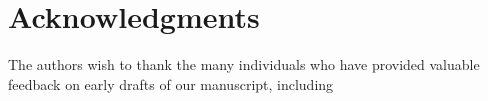 \chapter*{Acknowledgments}

The authors wish to thank the many individuals who have provided valuable feedback on early drafts of our manuscript, including
